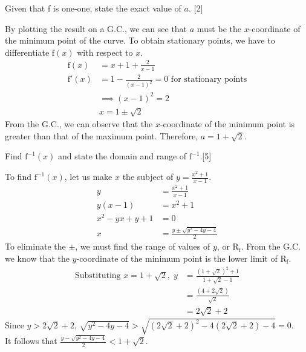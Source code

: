 \documentclass[12pt, a4 paper]{article}
\begin{document}
\begin{outline}[enumerate]
 \2 Given that f is one-one, state the exact value of \(a\). \hfill[2]
 \begin{answer}
  By plotting the result on a G.C., we can see that \(a\) must be the \(x\)-coordinate of the minimum point of the curve. To obtain stationary points, we have to differentiate \(\textrm{f}(x)\) with respect to \(x\).
  \begin{align*}
   \textrm{f}(x)  & =x+1+\frac{2}{x-1}                                         \\
   \textrm{f}'(x) & =1-\frac{2}{{(x-1)}^2}=0 \textrm{   for stationary points} \\
                  & \implies {(x-1)}^2=2                                       \\
                  & x=1\pm \sqrt{2}
  \end{align*}
  From the G.C., we can observe that the \(x\)-coordinate of the minimum point is greater than that of the maximum point. Therefore, \(a=1+\sqrt{2}\).
 \end{answer}
 \2 Find \(\textrm{f}^{-1}(x)\) and state the domain and range of \(\textrm{f}^{-1}\).\hfill[5]
 \begin{answer}
  To find \(\textrm{f}^{-1}(x)\), let us make \(x\) the subject of \(y=\frac{x^2+1}{x-1}\).
  \begin{align*}
   y          & =\frac{x^2+1}{x-1}               \\
   y(x-1)     & =x^2+1                           \\
   x^2-yx+y+1 & =0                               \\
   x          & = \frac{y\pm \sqrt{y^2-4y-4}}{2}
  \end{align*}
  To eliminate the \(\pm \), we must find the range of values of \(y\), or \(\textrm{R}_{\textrm{f}}\). From the G.C. we know that the \(y\)-coordinate of the minimum point is the lower limit of \(\textrm{R}_{\textrm{f}}\).
  \begin{align*}
   \textrm{Substituting }x=1+\sqrt{2},\; y & =\frac{{(1+\sqrt{2})}^2+1}{1+\sqrt{2}-1} \\
                                           & = \frac{(4+2\sqrt{2})}{\sqrt{2}}         \\
                                           & = 2\sqrt{2}+2
  \end{align*}
  Since \(y>2\sqrt{2}+2\), \(\sqrt{y^2-4y-4}>\sqrt{{(2\sqrt{2}+2)}^2-4(2\sqrt{2}+2)-4}=0\).\\
  It follows that \(\frac{y-\sqrt{y^2-4y-4}}{2}<1+\sqrt{2}\).\\

\end{answer}
\end{outline}
\end{document}
